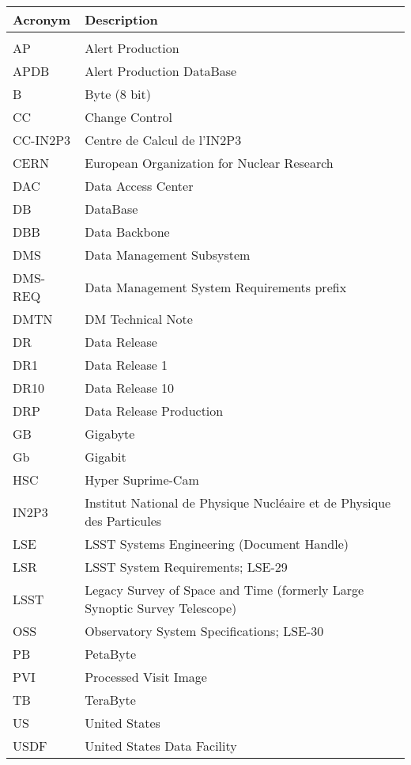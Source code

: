 \addtocounter{table}{-1}
\begin{longtable}{p{}p{}}\hline
\textbf{Acronym} & \textbf{Description}  \\\hline

 &  \\\hline
AP & Alert Production \\\hline
APDB & Alert Production DataBase \\\hline
B & Byte (8 bit) \\\hline
CC & Change Control \\\hline
CC-IN2P3 & Centre de Calcul de l'IN2P3 \\\hline
CERN & European Organization for Nuclear Research \\\hline
DAC & Data Access Center \\\hline
DB & DataBase \\\hline
DBB & Data Backbone \\\hline
DMS & Data Management Subsystem \\\hline
DMS-REQ & Data Management System Requirements prefix \\\hline
DMTN & DM Technical Note \\\hline
DR & Data Release \\\hline
DR1 & Data Release 1 \\\hline
DR10 & Data Release 10 \\\hline
DRP & Data Release Production \\\hline
GB & Gigabyte \\\hline
Gb & Gigabit \\\hline
HSC & Hyper Suprime-Cam \\\hline
IN2P3 & Institut National de Physique Nucléaire et de Physique des Particules \\\hline
LSE & LSST Systems Engineering (Document Handle) \\\hline
LSR & LSST System Requirements; LSE-29 \\\hline
LSST & Legacy Survey of Space and Time (formerly Large Synoptic Survey Telescope) \\\hline
OSS & Observatory System Specifications; LSE-30 \\\hline
PB & PetaByte \\\hline
PVI & Processed Visit Image \\\hline
TB & TeraByte \\\hline
US & United States \\\hline
USDF & United States Data Facility \\\hline
\end{longtable}
